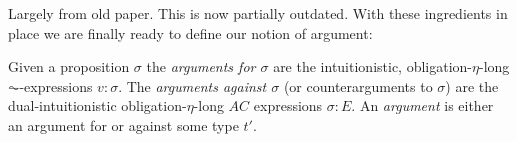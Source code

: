 \documentclass{article}
\begin{document}
\begin{oldpart}{Largely from old paper. This is now partially outdated.}
  With these ingredients in place we are finally ready to define our notion of argument:

  \begin{definition}[Argument]
    Given a proposition $\sigma$ the \emph{arguments for $\sigma$} are the intuitionistic, obligation-$\eta$-long $\AC$-expressions $v:\sigma$. The \emph{arguments against $\sigma$} (or counterarguments to $\sigma$) are the dual-intuitionistic obligation-$\eta$-long $AC$ expressions $\sigma:E$. An \emph{argument} is either an argument for or against some type $t'$.
  \end{definition}

\end{oldpart}
\end{document}
